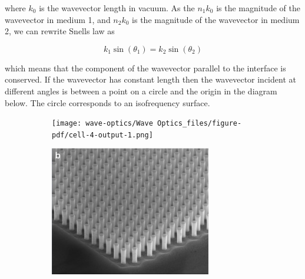 \documentclass[
  a4paper,
]{book}
\begin{document}
where \(k_0\) is the wavevector length in vacuum. As the \(n_1k_0\) is
the magnitude of the wavevector in medium 1, and \(n_2k_0\) is the
magnitude of the wavevector in medium 2, we can rewrite Snells law as

\[
k_1\sin(\theta_1)=k_2\sin(\theta_2)
\]

which means that the component of the wavevector parallel to the
interface is conserved. If the wavevector has constant length then the
wavevector incident at different angles is between a point on a circle
and the origin in the diagram below. The circle corresponds to an
isofrequency surface.

\begin{figure}

\begin{minipage}{0.33\linewidth}

\begin{figure}[H]

{\centering \texttt{[image: wave-optics/Wave Optics\_files/figure-pdf/cell-4-output-1.png]}

}


\end{figure}%

\end{minipage}%
%
\begin{minipage}{0.33\linewidth}

\begin{figure}[H]

{\centering \includegraphics[width=0.9\linewidth,height=\textheight,keepaspectratio]{wave-optics/img/pc_ex.png}

}
\end{figure}
\end{minipage}
\end{figure}
\end{document}

